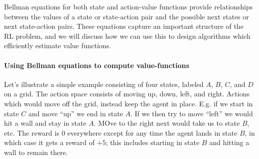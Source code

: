 \documentclass[12pt]{article}
\begin{document}
Bellman equations for both state and action-value functions provide relationships between the values of a state or state-action pair and the possible next states or next state-action pairs. These equations capture an important structure of the RL problem, and we will discuss how we can use this to design algorithms which efficiently estimate value functions.

\paragraph{Using Bellman equations to compute value-functions} Let's illustrate a simple example consisting of four states, labeled $A$, $B$, $C$, and $D$ on a grid. The action space consists of moving up, down, left, and right. Actions which would move off the grid, instead keep the agent in place. E.g. if we start in state $C$ and move ``up'' we end in state $A$. If we then try to move ``left'' we would hit a wall and stay in state $A$. MOve to the right next would take us to state $B$, etc. The reward is $0$ everywhere except for any time the agent lands in state $B$, in which case it gets a reward of $+5$; this includes starting in state $B$ and hitting a wall to remain there.
\begin{figure}[h]
  \centering
\end{figure}
\end{document}
